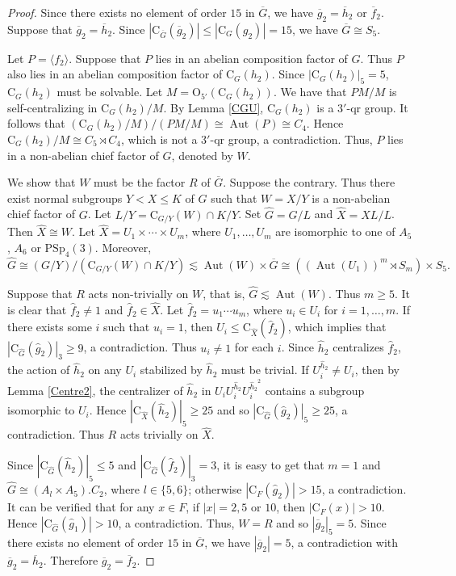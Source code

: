\documentclass[11pt]{article}
\providecommand{\PSp}{{\mathrm{PSp}}}
\providecommand{\C}{{\mathrm{C}}}
\providecommand{\rmO}{{\mathrm{O}}}
\providecommand{\Aut}{{\operatorname{Aut}}}
\providecommand{\gen}[1]{\langle #1 \rangle} %
\providecommand{\gen}[1]{\langle #1 \rangle} %
\providecommand{\gen}[1]{\langle #1 \rangle} %
\providecommand{\olf}{{\overline{f}}}
\providecommand{\olg}{{\overline{g}}}
\providecommand{\olh}{{\overline{h}}}
\providecommand{\olG}{{\overline{G}}}
\providecommand{\whf}{{\widehat{f}}}
\providecommand{\whg}{{\widehat{g}}}
\providecommand{\whh}{{\widehat{h}}}
\providecommand{\whG}{{\widehat{G}}}
\providecommand{\whX}{{\widehat{X}}}
\begin{document}
\begin{proof}
    Since there exists no element of order $15$ in $\olG$,
    we have $\olg_2 = \olh_2$ or $\olf_2$.
    Suppose that $\olg_2 = \olh_2$.
    Since $|\C_{\olG}(\olg_2)|\leq |\C_G(g_2)|=15$,
    we have $\olG \cong S_5$.
    
    Let $P=\gen{f_2}$.
    Suppose that $P$ lies in an abelian composition factor of $G$.
    Thus $P$ also lies in an abelian composition factor of $\C_G(h_2)$.
    Since $|\C_G(h_2)|_5=5$, $\C_G(h_2)$ must be solvable.
    Let $M=\rmO_{5'}(\C_G(h_2))$. 
    We have that $PM/M$ is self-centralizing in $\C_G(h_2)/M$.
    By Lemma \ref{CGU}, $\C_G(h_2)$ is a $3'$-qr group. 
    It follows that $(\C_G(h_2)/M)/(PM/M)\cong \Aut(P)\cong C_4$.
    Hence $\C_G(h_2)/M\cong C_5\rtimes C_4$, 
    which is not a $3'$-qr group, a contradiction.
    Thus, $P$ lies in a non-abelian chief factor of $G$,
    denoted by $W$.
    
    We show that $W$ must be the factor $R$ of $\olG$.
    Suppose the contrary. Thus there exist normal subgroups $Y<X\leq K$ of $G$
    such that $W=X/Y$ is a non-abelian chief factor of $G$.
    Let $L/Y=\C_{G/Y}(W)\cap K/Y$.
    Set $\whG=G/L$ and $\whX=XL/L$.
    Then $\whX\cong W$.
    Let $\whX=U_1\times \cdots \times U_m$,
    where $U_1,\ldots, U_m$ are isomorphic to one of $A_5$, $A_6$ or $\PSp_4(3)$.
    Moreover,
    $$ \whG \cong (G/Y)/(\C_{G/Y}(W)\cap K/Y)
        \lesssim \Aut(W)\times \olG
        \cong ((\Aut(U_1))^m\rtimes S_m)\times S_5. $$

    Suppose that $R$ acts non-trivially on $W$, that is, $\whG\lesssim \Aut(W)$.
    Thus $m\geq 5$.
    It is clear that $\whf_2\neq 1$ and $\whf_2\in \whX$.
    Let $\whf_2=u_1\cdots u_m$, where $u_i\in U_i$ for $i=1,\ldots,m$.
    If there exists some $i$ such that $u_i=1$,
    then $U_i\leq \C_{\whX}(\whf_2)$,
    which implies that $|\C_{\whG}(\whg_2)|_3\geq 9$,
    a contradiction.
    Thus $u_i\neq 1$ for each $i$.
    Since $\whh_2$ centralizes $\whf_2$, 
    the action of $\whh_2$ on any $U_i$ stabilized by $\whh_2$ must be trivial.
    If $U_i^{\whh_2} \neq U_i$, then by Lemma \ref{Centre2},
    the centralizer of $\whh_2$ in $U_iU_i^{\whh_2}U_i^{{\whh_2}^2}$ contains a subgroup isomorphic to $U_i$.
    Hence $|\C_{\whX}(\whh_2)|_5\geq 25$ and so $|\C_{\whG}(\whg_2)|_5\geq 25$, a contradiction.
    Thus $R$ acts trivially on $\whX$.

    
    Since $|\C_{\whG}(\whh_2)|_5\leq 5$ and $|\C_{\whG}(\whf_2)|_3=3$, 
    it is easy to get that $m=1$
    and $\whG \cong (A_l\times A_5).C_2$, where $l\in\{5,6\}$; otherwise $|\C_F(\whg_2)|>15$, a contradiction. 
    It can be verified that for any $x\in F$, if $|x|=2, 5$ or $10$, then $|\C_F(x)|>10$.
    Hence $|\C_{\whG}(\whg_1)|>10$, a contradiction.
    Thus, $W=R$ and so $|\overline g_2|_5=5$.
    Since there exists no element of order $15$ in $\olG$, we have $|\overline g_2|=5$,
    a contradiction with $\olg_2=\olh_2$.
    Therefore $\overline {g}_2=\overline f_2$.


\end{proof}
\end{document}
